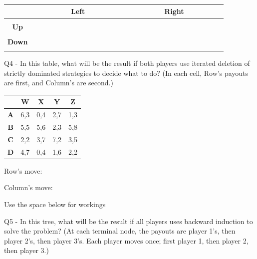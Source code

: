 \documentclass[
  12pt,
  letterpaper,
  DIV=11,
  numbers=noendperiod]{scrartcl}
\begin{document}
\vspace{0.3cm} \dotfill

\vspace{0.3cm} \dotfill

\vspace{0.3cm} \dotfill

\vspace{0.3cm} \dotfill

\vspace{0.3cm} \dotfill

\vspace{0.3cm} \dotfill

\vspace{1cm}

\begin{longtable}[]{@{}ccc@{}}
\toprule\noalign{}
& ~~~~~~~~~\textbf{Left}~~~~~~~~~ & ~~~~~~~~~\textbf{Right}~~~~~~~~~ \\
\midrule\noalign{}
\endhead
\bottomrule\noalign{}
\endlastfoot
& & \\
\textbf{Up} & & \\
& & \\
\textbf{Down} & & \\
& & \\
\end{longtable}

\newpage

Q4 - In this table, what will be the result if both players use iterated
deletion of strictly dominated strategies to decide what to do? (In each
cell, Row's payouts are first, and Column's are second.)

\begin{longtable}[]{@{}ccccc@{}}
\toprule\noalign{}
& \textbf{W} & \textbf{X} & \textbf{Y} & \textbf{Z} \\
\midrule\noalign{}
\endhead
\bottomrule\noalign{}
\endlastfoot
\textbf{A} & 6,3 & 0,4 & 2,7 & 1,3 \\
\textbf{B} & 5,5 & 5,6 & 2,3 & 5,8 \\
\textbf{C} & 2,2 & 3,7 & 7,2 & 3,5 \\
\textbf{D} & 4,7 & 0,4 & 1,6 & 2,2 \\
\end{longtable}

Row's move: \dotfill

Column's move: \dotfill

Use the space below for workings

\newpage

Q5 - In this tree, what will be the result if all players uses backward
induction to solve the problem? (At each terminal node, the payouts are
player 1's, then player 2's, then player 3's. Each player moves once;
first player 1, then player 2, then player 3.)
\end{document}
